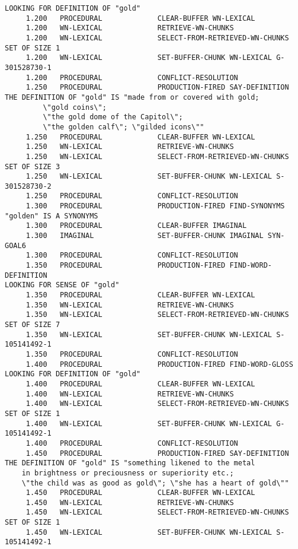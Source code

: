\begin{verbatim}
LOOKING FOR DEFINITION OF "gold" 
     1.200   PROCEDURAL             CLEAR-BUFFER WN-LEXICAL 
     1.200   WN-LEXICAL             RETRIEVE-WN-CHUNKS 
     1.200   WN-LEXICAL             SELECT-FROM-RETRIEVED-WN-CHUNKS SET OF SIZE 1 
     1.200   WN-LEXICAL             SET-BUFFER-CHUNK WN-LEXICAL G-301528730-1 
     1.200   PROCEDURAL             CONFLICT-RESOLUTION 
     1.250   PROCEDURAL             PRODUCTION-FIRED SAY-DEFINITION 
THE DEFINITION OF "gold" IS "made from or covered with gold;
         \"gold coins\"; 
         \"the gold dome of the Capitol\"; 
         \"the golden calf\"; \"gilded icons\"" 
     1.250   PROCEDURAL             CLEAR-BUFFER WN-LEXICAL 
     1.250   WN-LEXICAL             RETRIEVE-WN-CHUNKS 
     1.250   WN-LEXICAL             SELECT-FROM-RETRIEVED-WN-CHUNKS SET OF SIZE 3 
     1.250   WN-LEXICAL             SET-BUFFER-CHUNK WN-LEXICAL S-301528730-2 
     1.250   PROCEDURAL             CONFLICT-RESOLUTION 
     1.300   PROCEDURAL             PRODUCTION-FIRED FIND-SYNONYMS 
"golden" IS A SYNONYMS 
     1.300   PROCEDURAL             CLEAR-BUFFER IMAGINAL 
     1.300   IMAGINAL               SET-BUFFER-CHUNK IMAGINAL SYN-GOAL6 
     1.300   PROCEDURAL             CONFLICT-RESOLUTION 
     1.350   PROCEDURAL             PRODUCTION-FIRED FIND-WORD-DEFINITION 
LOOKING FOR SENSE OF "gold" 
     1.350   PROCEDURAL             CLEAR-BUFFER WN-LEXICAL 
     1.350   WN-LEXICAL             RETRIEVE-WN-CHUNKS 
     1.350   WN-LEXICAL             SELECT-FROM-RETRIEVED-WN-CHUNKS SET OF SIZE 7 
     1.350   WN-LEXICAL             SET-BUFFER-CHUNK WN-LEXICAL S-105141492-1 
     1.350   PROCEDURAL             CONFLICT-RESOLUTION 
     1.400   PROCEDURAL             PRODUCTION-FIRED FIND-WORD-GLOSS 
LOOKING FOR DEFINITION OF "gold" 
     1.400   PROCEDURAL             CLEAR-BUFFER WN-LEXICAL 
     1.400   WN-LEXICAL             RETRIEVE-WN-CHUNKS 
     1.400   WN-LEXICAL             SELECT-FROM-RETRIEVED-WN-CHUNKS SET OF SIZE 1 
     1.400   WN-LEXICAL             SET-BUFFER-CHUNK WN-LEXICAL G-105141492-1 
     1.400   PROCEDURAL             CONFLICT-RESOLUTION 
     1.450   PROCEDURAL             PRODUCTION-FIRED SAY-DEFINITION 
THE DEFINITION OF "gold" IS "something likened to the metal 
    in brightness or preciousness or superiority etc.;
    \"the child was as good as gold\"; \"she has a heart of gold\"" 
     1.450   PROCEDURAL             CLEAR-BUFFER WN-LEXICAL 
     1.450   WN-LEXICAL             RETRIEVE-WN-CHUNKS 
     1.450   WN-LEXICAL             SELECT-FROM-RETRIEVED-WN-CHUNKS SET OF SIZE 1 
     1.450   WN-LEXICAL             SET-BUFFER-CHUNK WN-LEXICAL S-105141492-1 

\end{verbatim}
